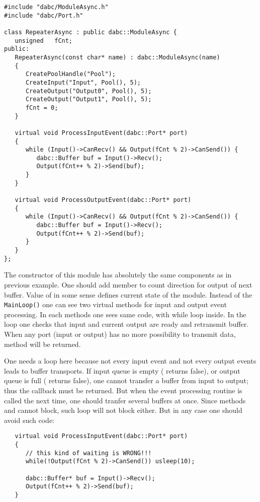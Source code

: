\begin{small}
\begin{verbatim}
#include "dabc/ModuleAsync.h"
#include "dabc/Port.h"

class RepeaterAsync : public dabc::ModuleAsync {
   unsigned   fCnt;
public:
   RepeaterAsync(const char* name) : dabc::ModuleAsync(name)
   {
      CreatePoolHandle("Pool");
      CreateInput("Input", Pool(), 5);
      CreateOutput("Output0", Pool(), 5);
      CreateOutput("Output1", Pool(), 5);
      fCnt = 0;
   }
    
   virtual void ProcessInputEvent(dabc::Port* port) 
   {
      while (Input()->CanRecv() && Output(fCnt % 2)->CanSend()) {
         dabc::Buffer buf = Input()->Recv();
         Output(fCnt++ % 2)->Send(buf);
      }
   }

   virtual void ProcessOutputEvent(dabc::Port* port) 
   {
      while (Input()->CanRecv() && Output(fCnt % 2)->CanSend()) {
         dabc::Buffer buf = Input()->Recv();
         Output(fCnt++ % 2)->Send(buf);
      }
   }
};
\end{verbatim}
\end{small}

The constructor of this module has absolutely the same components as in previous example.
One should add  member to count direction for output of next buffer.
Value of  in some sense defines current state of the module. 
Instead of the {\tt MainLoop()} one can see two virtual methods for input and output event
processing. In each methods one sees same code, with while loop inside.
In the loop one checks that input and current output are ready and retransmit buffer.
When any port (input or output) has no more possibility to transmit data, 
method will be returned. 

One needs a  loop here because not every input event and not every output events leads to buffer transports. 
If input queue is empty ( returns false), 
or output queue is full ( returns false), 
one cannot transfer a buffer from input to output; 
thus the callback must be returned. 
But when the event processing routine is called the next time, 
one should tranfer several buffers at once. 
Since methods  and   
cannot block, such  loop will not block either. 
But in any case one should  avoid such  code:

\begin{small}
\begin{verbatim}
   virtual void ProcessInputEvent(dabc::Port* port) 
   {
      // this kind of waiting is WRONG!!!
      while(!Output(fCnt % 2)->CanSend()) usleep(10);
   
      dabc::Buffer* buf = Input()->Recv();
      Output(fCnt++ % 2)->Send(buf);
   }

\end{verbatim}
\end{small}

